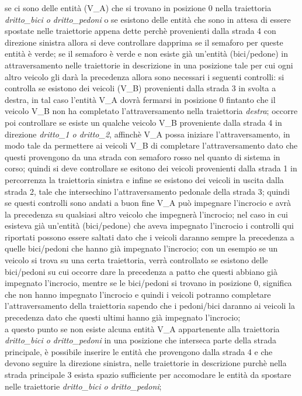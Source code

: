 \begin{enumerate}
\begin{enumerate}
se ci sono delle entità (V\_A) che si trovano in posizione 0 nella traiettoria \textit{drit\-to\_bi\-ci o drit\-to\_pe\-do\-ni} o se esistono delle entità che sono in attesa di essere spostate nelle traiettorie appena dette perchè provenienti dalla strada 4 con direzione sinistra allora si deve controllare dapprima se il semaforo per queste entità è verde; se il semaforo è verde e non esiste già un'entità (bici/pedone) in attraversamento nelle traiettorie in descrizione in una posizione tale per cui ogni altro veicolo gli darà la precedenza allora sono necessari i seguenti controlli: si controlla se esistono dei veicoli (V\_B) provenienti dalla strada 3 in svolta a destra, in tal caso l'entità V\_A dovrà fermarsi in posizione 0 fintanto che il veicolo V\_B non ha completato l'attraversamento nella traiettoria \textit{destra}; occorre poi controllare se esiste un qualche veicolo V\_B proveniente dalla strada 4 in direzione \textit{dritto\_1 o dritto\_2}, affinchè V\_A possa iniziare l'attraversamento, in modo tale da permettere ai veicoli V\_B di completare l'attraversamento dato che questi provengono da una strada con semaforo rosso nel quanto di sistema in corso; quindi si deve controllare se esitono dei veicoli provenienti dalla strada 1 in percorrenza la traiettoria sinistra e infine se esistono dei veicoli in uscita dalla strada 2, tale che intersechino l'attraversamento pedonale della strada 3; quindi se questi controlli sono andati a buon fine V\_A può impegnare l'incrocio e avrà la precedenza su qualsiasi altro veicolo che impegnerà l'incrocio; nel caso in cui esisteva già un'entità (bici/pedone) che aveva impegnato l'incrocio i controlli qui riportati possono essere saltati dato che i veicoli daranno sempre la precedenza a quelle bici/pedoni che hanno già impegnato l'incrocio; con un esempio se un veicolo si trova su una certa traiettoria, verrà controllato se esistono delle bici/pedoni su cui occorre dare la precedenza a patto che questi abbiano già impegnato l'incrocio, mentre se le bici/pedoni si trovano in posizione 0, significa che non hanno impegnato l'incrocio e quindi i veicoli potranno completare l'attraversamento della traiettoria sapendo che i pedoni/bici daranno ai veicoli la precedenza dato che questi ultimi hanno già impegnato l'incrocio; \\
a questo punto se non esiste alcuna entità V\_A appartenente alla traiettoria \textit{drit\-to\_bi\-ci o drit\-to\_pe\-do\-ni} in una posizione che interseca parte della strada principale, è possibile inserire le entità che provengono dalla strada 4 e che devono seguire la direzione sinistra, nelle traiettorie in descrizione purchè nella strada principale 3 esista spazio sufficiente per accomodare le entità da spostare nelle traiettorie \textit{drit\-to\_bi\-ci o drit\-to\_pe\-do\-ni}; \\

\end{enumerate}
\end{enumerate}
